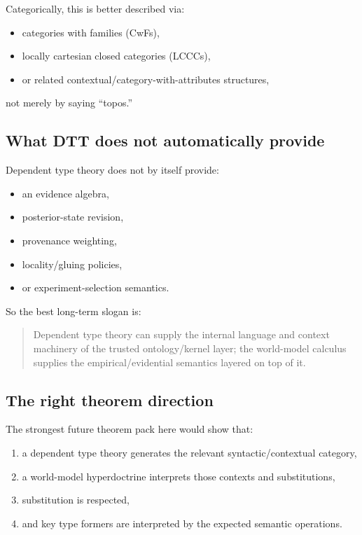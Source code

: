 \documentclass[11pt]{article}
\begin{document}
Categorically, this is better described via:
\begin{itemize}
  \item categories with families (CwFs),
  \item locally cartesian closed categories (LCCCs),
  \item or related contextual/category-with-attributes structures,
\end{itemize}
not merely by saying ``topos.''

\subsection{What DTT does not automatically provide}

Dependent type theory does not by itself provide:
\begin{itemize}
  \item an evidence algebra,
  \item posterior-state revision,
  \item provenance weighting,
  \item locality/gluing policies,
  \item or experiment-selection semantics.
\end{itemize}

So the best long-term slogan is:
\begin{quote}
Dependent type theory can supply the internal language and context machinery of
the trusted ontology/kernel layer; the world-model calculus supplies the
empirical/evidential semantics layered on top of it.
\end{quote}

\subsection{The right theorem direction}

The strongest future theorem pack here would show that:
\begin{enumerate}
  \item a dependent type theory generates the relevant syntactic/contextual
        category,
  \item a world-model hyperdoctrine interprets those contexts and substitutions,
  \item substitution is respected,
  \item and key type formers are interpreted by the expected semantic
        operations.
\end{enumerate}
\end{document}
